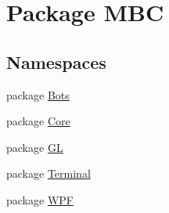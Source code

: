 \hypertarget{namespace_m_b_c}{\section{Package M\-B\-C}
\label{namespace_m_b_c}
}
\subsection*{Namespaces}
\begin{DoxyCompactItemize}
\item 
package \hyperlink{namespace_m_b_c_1_1_bots}{Bots}
\item 
package \hyperlink{namespace_m_b_c_1_1_core}{Core}
\item 
package \hyperlink{namespace_m_b_c_1_1_g_l}{G\-L}
\item 
package \hyperlink{namespace_m_b_c_1_1_terminal}{Terminal}
\item 
package \hyperlink{namespace_m_b_c_1_1_w_p_f}{W\-P\-F}
\end{DoxyCompactItemize}
